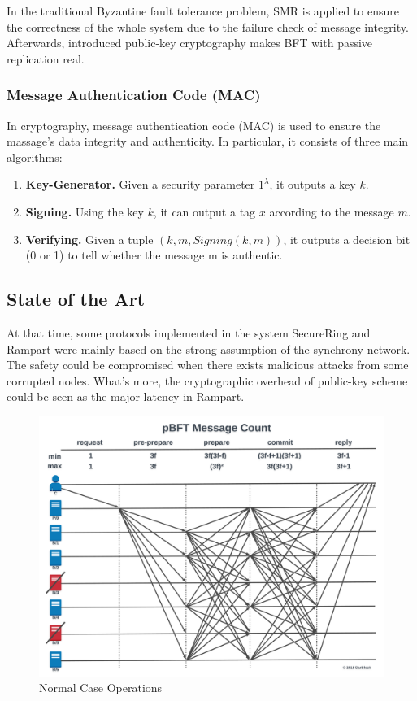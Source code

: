 \documentclass[conference]{IEEEtran}
\begin{document}
In the traditional Byzantine fault tolerance problem, SMR is applied to ensure the correctness of the whole system due to the failure check of message integrity.
%
Afterwards, introduced public-key cryptography makes BFT with passive replication real.

\subsubsection{Message Authentication Code (MAC)}
In cryptography, message authentication code (MAC) is used to ensure the massage's data integrity and authenticity.
%
In particular, it consists of three main algorithms:

\begin{enumerate}[label=(\roman*)]
    \item \textbf{Key-Generator.} Given a security parameter $1^{\lambda}$, it outputs a key $k$.
    \item \textbf{Signing.} Using the key $k$, it can output a tag $x$ according to the message $m$.
    \item \textbf{Verifying.} Given a tuple $(k, m, Signing(k, m))$, it outputs a decision bit (0 or 1) to tell whether the message m is authentic.
\end{enumerate}

\subsection{State of the Art}
At that time, some protocols implemented in the system SecureRing and Rampart were mainly based on the strong assumption of the synchrony network.
%
The safety could be compromised when there exists malicious attacks from some corrupted nodes.
%
What's more, the cryptographic overhead of public-key scheme could be seen as the major latency in Rampart. 

\begin{figure}[ht]
    \centering
    \includegraphics[width= 0.95\linewidth]{fig/PBFT.png}
    \caption{Normal Case Operations}
    \label{pbft}
\end{figure}
\end{document}
